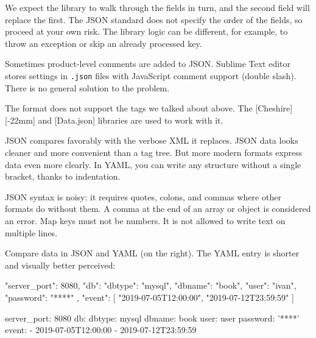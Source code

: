 \fi

We expect the library to walk through the fields in turn, and the second field will replace the first. The JSON standard does not specify the order of the fields, so proceed at your own risk. The library logic can be different, for example, to throw an exception or skip an already processed key.

Sometimes product-level comments are added to JSON. Sublime Text editor stores settings in \verb|.json| files with JavaScript comment support (double slash). There is no general solution to the problem.


The format does not support the tags we talked about above. The [Cheshire][-22mm] and [Data.json] libraries are used to work with it.

JSON compares favorably with the verbose XML it replaces. JSON data looks cleaner and more convenient than a tag tree.  But more modern formats express data even more clearly. In YAML, you can write any structure without a single bracket, thanks to indentation.

JSON syntax is noisy: it requires quotes, colons, and commas where other formats do without them. A comma at the end of an array or object is considered an error. Map keys must not be numbers. It is not allowed to write text on multiple lines.

Compare data in JSON and YAML (on the right). The YAML entry is shorter and visually better perceived:

\ifx\DEVICETYPE\MOBILE

\begin{json}
{
    "server_port": 8080,
    "db": {
        "dbtype":   "mysql",
        "dbname":   "book",
        "user":     "ivan",
        "password": "****"
    },
    "event": [
        "2019-07-05T12:00:00",
        "2019-07-12T23:59:59"
    ]
}
\end{json}

\splitter

\begin{yaml}
server_port: 8080
db:
  dbtype:   mysql
  dbname:   book
  user:     user
  password: '****'
event:
  - 2019-07-05T12:00:00
  - 2019-07-12T23:59:59
\end{yaml}

\else



